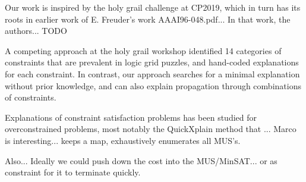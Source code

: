 Our work is inspired by the holy grail challenge at CP2019, which in turn has its roots in earlier work of E. Freuder's work \cite{}AAAI96-048.pdf... In that work, the authors... TODO

A competing approach at the holy grail workshop \cite{} identified 14 categories of constraints that are prevalent in logic grid puzzles, and hand-coded explanations for each constraint. In contrast, our approach searches for a minimal explanation without prior knowledge, and can also explain propagation through combinations of constraints.

Explanations of constraint satisfaction problems has been studied for overconstrained problems, most notably the QuickXplain method \cite{} that ...
Marco is interesting... keeps a map, exhaustively enumerates all MUS's.

Also...  Ideally we could push down the cost into the MUS/MinSAT... or as constraint for it to terminate quickly.
